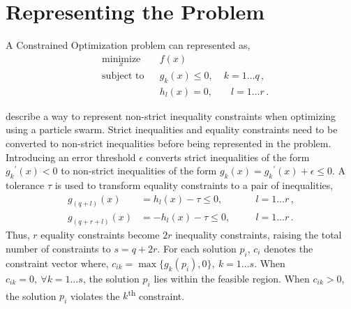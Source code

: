 \documentclass[10pt,draft]{article}
\newcommand{\tsup}{\textsuperscript}
\begin{document}
\section{Representing the Problem}\label{sec:rep}

A Constrained Optimization problem can represented as,
\begin{equation*}
  \begin{aligned}
    & \underset{x}{\text{minimize}}
    & & f(x) \\
    & \text{subject to}
    & & g_k(x) \leq 0,&\; k = 1\dots q\,,\\
    &&& h_l(x) = 0,&\quad l = 1\dots r\,.
  \end{aligned}
\end{equation*}

\textcite{Cop} describe a way to represent non-strict inequality constraints when optimizing using a particle swarm.
Strict inequalities and equality constraints need to be converted to non-strict inequalities before being represented in
the problem. Introducing an error threshold $\epsilon$ converts strict inequalities of the form ${g_k}^{\prime}(x) < 0$
to non-strict inequalities of the form $g_k(x) = {g_k}^{\prime}(x) + \epsilon \leq 0$. A tolerance $\tau$ is used to
transform equality constraints to a pair of inequalities,
\begin{equation*}
  \begin{aligned}
    g_{(q+l)}(x) &= h_l(x) - \tau \leq 0,&&\quad l = 1\dots r\,,\\
    g_{(q+r+l)}(x) &= {-}h_l(x) - \tau \leq 0,&&\quad l = 1\dots r\,.
  \end{aligned}
\end{equation*}
Thus, $r$ equality constraints become $2r$ inequality constraints, raising the total number of constraints to $s = q +
2r$. For each solution $p_i$, $c_i$ denotes the constraint vector where, $c_{ik} = \max\{g_k(p_i), 0\},~k=1\dots s$.
When $c_{ik} = 0,~\forall k=1\dots s$, the solution $p_i$ lies within the feasible region. When $c_{ik} > 0$, the
solution $p_i$ violates the $k$\tsup{th} constraint.
\end{document}
